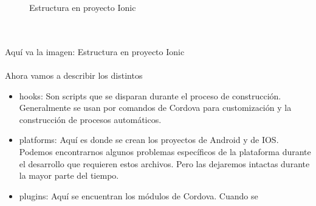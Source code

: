 \documentclass[a4paper, 11pt]{article}
\begin{document}
\begin{itemize}
\begin{figure}[H]
                     \caption{Estructura en proyecto Ionic}
                     \label{f:estructura}
              \end{figure}
              \\\\\textcolor[rgb]{1,0,0}{Aquí va la imagen: Estructura en proyecto Ionic}\\\\
            Ahora vamos a describir los distintos
            \begin{itemize}
                \item{hooks: Son scripts que se disparan durante el proceso de
                      construcción. Generalmente se usan por comandos de Cordova
                      para customización y la construcción de procesos automáticos.}
                \item{platforms: Aquí es donde se crean los proyectos de Android y
                      de IOS. Podemos encontrarnos algunos problemas específicos de
                      la plataforma durante el desarrollo que requieren estos
                      archivos. Pero las dejaremos intactas durante la mayor parte
                      del tiempo.}
                \item{plugins: Aquí se encuentran los módulos de Cordova. Cuando se
}
\end{itemize}
\end{itemize}
\end{document}

